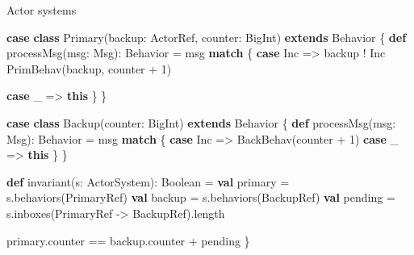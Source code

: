 \documentclass[
  ignorenonframetext,
]{beamer}
\newenvironment{Shaded}{}{}
\newcommand{\DecValTok}[1]{\textcolor[rgb]{0.25,0.63,0.44}{#1}}
\newcommand{\FunctionTok}[1]{\textcolor[rgb]{0.02,0.16,0.49}{#1}}
\newcommand{\KeywordTok}[1]{\textcolor[rgb]{0.00,0.44,0.13}{\textbf{#1}}}
\newcommand{\NormalTok}[1]{#1}
\begin{document}
\begin{frame}[fragile]{Actor systems}
\protect\hypertarget{actor-systems}{}

\begin{Shaded}
\begin{Highlighting}[]
\KeywordTok{case} \KeywordTok{class} \FunctionTok{Primary}\NormalTok{(backup: ActorRef, counter: BigInt) }\KeywordTok{extends}\NormalTok{ Behavior \{}
  \KeywordTok{def} \FunctionTok{processMsg}\NormalTok{(msg: Msg): Behavior = msg }\KeywordTok{match}\NormalTok{ \{}
    \KeywordTok{case}\NormalTok{ Inc =>}
\NormalTok{      backup ! Inc}
      \FunctionTok{PrimBehav}\NormalTok{(backup, counter + }\DecValTok{1}\NormalTok{)}

    \KeywordTok{case}\NormalTok{ _ => }\KeywordTok{this}
\NormalTok{  \}}
\NormalTok{\}}
\end{Highlighting}
\end{Shaded}

\end{frame}

\begin{frame}[fragile]

\begin{Shaded}
\begin{Highlighting}[]
\KeywordTok{case} \KeywordTok{class} \FunctionTok{Backup}\NormalTok{(counter: BigInt) }\KeywordTok{extends}\NormalTok{ Behavior \{}
  \KeywordTok{def} \FunctionTok{processMsg}\NormalTok{(msg: Msg): Behavior = msg }\KeywordTok{match}\NormalTok{ \{}
    \KeywordTok{case}\NormalTok{ Inc => }\FunctionTok{BackBehav}\NormalTok{(counter + }\DecValTok{1}\NormalTok{)}
    \KeywordTok{case}\NormalTok{ _   => }\KeywordTok{this}
\NormalTok{  \}}
\NormalTok{\}}
\end{Highlighting}
\end{Shaded}

\end{frame}

\begin{frame}[fragile]

\begin{Shaded}
\begin{Highlighting}[]
\KeywordTok{def} \FunctionTok{invariant}\NormalTok{(s: ActorSystem): Boolean =}
  \KeywordTok{val}\NormalTok{ primary = s.}\FunctionTok{behaviors}\NormalTok{(PrimaryRef)}
  \KeywordTok{val}\NormalTok{ backup  = s.}\FunctionTok{behaviors}\NormalTok{(BackupRef)}
  \KeywordTok{val}\NormalTok{ pending = s.}\FunctionTok{inboxes}\NormalTok{(PrimaryRef -> BackupRef).}\FunctionTok{length}

\NormalTok{  primary.}\FunctionTok{counter}\NormalTok{ == backup.}\FunctionTok{counter}\NormalTok{ + pending}
\NormalTok{\}}
\end{Highlighting}
\end{Shaded}

\end{frame}
\end{document}
